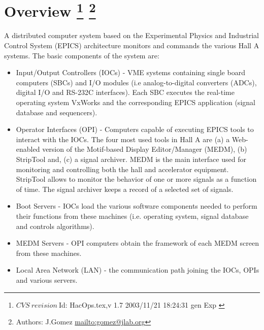 \section[Overview]{Overview
\footnote{
  $CVS~revision~ $Id: HacOps.tex,v 1.7 2003/11/21 18:24:31 gen Exp $ $
}
\footnote{Authors: J.Gomez \url{mailto:gomez@jlab.org}}
}


A distributed computer system
based on the 
Experimental Physics and Industrial Control System 
(EPICS)
 architecture monitors and commands
the various Hall A systems. The basic components of the system are:
\begin{itemize}
\item Input/Output Controllers (IOCs) - VME systems containing single
board computers (SBCs) and I/O modules
(i.e analog-to-digital converters (ADCs), digital I/O and RS-232C interfaces).
Each SBC executes the real-time operating system VxWorks and the corresponding EPICS application (signal database
and sequencers).
\item Operator Interfaces (OPI) - Computers capable of executing
EPICS tools to interact with the IOCs.
The four most used tools in Hall A are (a)
a Web-enabled version of the Motif-based Display Editor/Manager (MEDM), (b) StripTool and, (c) a signal archiver.
MEDM is the main interface used for monitoring and controlling both the hall and accelerator
equipment. StripTool allows to monitor 
the behavior of one or more signals as a function of time. 
The signal archiver keeps a record of a selected set of signals.
\item Boot Servers - IOCs load the various
software components needed to perform their functions from these machines (i.e. operating system,
signal database and controls algorithms).
\item MEDM Servers - OPI computers obtain the framework of each MEDM screen from these machines.
\item Local Area Network (LAN) - the communication path joining the IOCs, OPIs and various servers.
\end{itemize}

